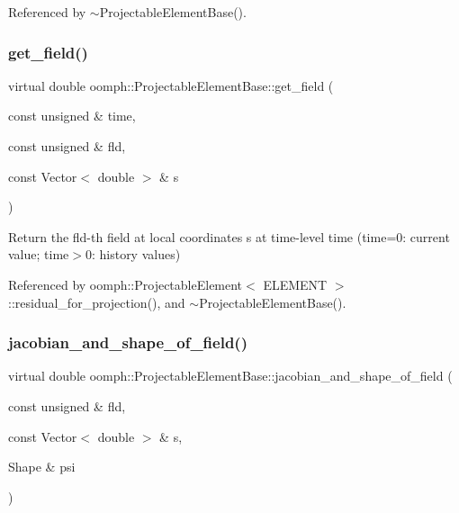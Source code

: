 Referenced by $\sim$\+Projectable\+Element\+Base().

\mbox{\label{classoomph_1_1ProjectableElementBase_ae4da5b565b6d333be2f5920f7be763cd}} 
\subsubsection{\texorpdfstring{get\+\_\+field()}{get\_field()}}
{\footnotesize\ttfamily virtual double oomph\+::\+Projectable\+Element\+Base\+::get\+\_\+field (\begin{DoxyParamCaption}\item[{const unsigned \&}]{time,  }\item[{const unsigned \&}]{fld,  }\item[{const Vector$<$ double $>$ \&}]{s }\end{DoxyParamCaption})\hspace{0.3cm}{\ttfamily [pure virtual]}}



Return the fld-\/th field at local coordinates s at time-\/level time (time=0\+: current value; time$>$0\+: history values) 



Referenced by oomph\+::\+Projectable\+Element$<$ E\+L\+E\+M\+E\+N\+T $>$\+::residual\+\_\+for\+\_\+projection(), and $\sim$\+Projectable\+Element\+Base().

\mbox{\label{classoomph_1_1ProjectableElementBase_ad45c21b58c0985d52f68ab2d79cbb488}} 
\subsubsection{\texorpdfstring{jacobian\+\_\+and\+\_\+shape\+\_\+of\+\_\+field()}{jacobian\_and\_shape\_of\_field()}}
{\footnotesize\ttfamily virtual double oomph\+::\+Projectable\+Element\+Base\+::jacobian\+\_\+and\+\_\+shape\+\_\+of\+\_\+field (\begin{DoxyParamCaption}\item[{const unsigned \&}]{fld,  }\item[{const Vector$<$ double $>$ \&}]{s,  }\item[{Shape \&}]{psi }\end{DoxyParamCaption})\hspace{0.3cm}{\ttfamily [pure virtual]}}



